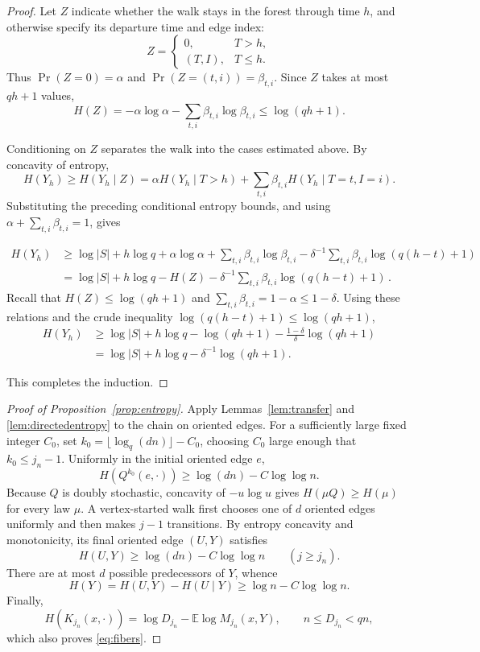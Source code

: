 \documentclass[11pt,reqno]{amsart}
\theoremstyle{definition}
\begin{document}
\begin{proof}
Let $Z$ indicate whether the walk stays in the forest through
time $h$, and otherwise specify its departure time and edge index:
\[
 Z=
 \begin{cases}
  0,&T>h,\\
  (T,I),&T\le h.
 \end{cases}
\]
Thus $\Pr(Z=0)=\alpha$ and $\Pr(Z=(t,i))=\beta_{t,i}$.
Since $Z$ takes at most $qh+1$ values,
\[
 H(Z)=-\alpha\log\alpha-\sum_{t,i}\beta_{t,i}\log\beta_{t,i}
 \le\log(qh+1).
\]

Conditioning on $Z$ separates the walk into the cases
estimated above. By concavity of entropy,
\[
 H(Y_h)
 \ge H(Y_h\mid Z) =\alpha H(Y_h\mid T>h)
   +\sum_{t,i}\beta_{t,i}H(Y_h\mid T=t,I=i).
\]
Substituting the preceding conditional entropy bounds, and using
$\alpha+\sum_{t,i}\beta_{t,i}=1$, gives

\begin{align*}
 H(Y_h)
 &\ge \log|S|+h\log q
      +\alpha\log\alpha+\sum_{t,i}\beta_{t,i}\log\beta_{t,i}
      -\delta^{-1}\sum_{t,i}\beta_{t,i}\log(q(h-t)+1)\\
 &=\log|S|+h\log q-H(Z)
      -\delta^{-1}\sum_{t,i}\beta_{t,i}\log(q(h-t)+1)\,.
\end{align*}
Recall that $H(Z)\le\log(qh+1)$ and
$\sum_{t,i}\beta_{t,i}=1-\alpha\le1-\delta$. Using these relations and the crude inequality $\log(q(h-t)+1)\le\log(qh+1)$,
\[
 \begin{aligned}
 H(Y_h)  &\ge\log|S|+h\log q-\log(qh+1)
      -\frac{1-\delta}{\delta}\log(qh+1)\\
 &=\log|S|+h\log q-\delta^{-1}\log(qh+1).
 \end{aligned}
\]

This completes the induction.
\end{proof}


\begin{proof}[Proof of Proposition~\ref{prop:entropy}]
Apply Lemmas~\ref{lem:transfer} and \ref{lem:directedentropy} to the
chain on oriented edges. For a sufficiently large fixed integer
$C_0$, set $k_0=\lfloor\log_q(dn)\rfloor-C_0$, choosing $C_0$
large enough that $k_0\le j_n-1$.
Uniformly in the initial oriented edge $e$,
\[
 H(Q^{k_0}(e,\cdot))\ge\log(dn)-C\log\log n.
\]
Because $Q$ is doubly stochastic, concavity of $-u\log u$ gives
$H(\mu Q)\ge H(\mu)$ for every law $\mu$.
A vertex-started walk first chooses one of $d$ oriented edges
uniformly and then makes $j-1$ transitions. By entropy concavity
and monotonicity, its final oriented edge $(U,Y)$ satisfies
\[
 H(U,Y)\ge\log(dn)-C\log\log n\qquad(j\ge j_n).
\]
There are at most $d$ possible predecessors of $Y$, whence
\[
 H(Y)=H(U,Y)-H(U\mid Y)\ge\log n-C\log\log n.
\]
Finally,
\[
 H(K_{j_n}(x,\cdot))
 =\log D_{j_n}-\mathbb E\log M_{j_n}(x,Y),
 \qquad n\le D_{j_n}<qn,
\]
which also proves \eqref{eq:fibers}.
\end{proof}
\end{document}
